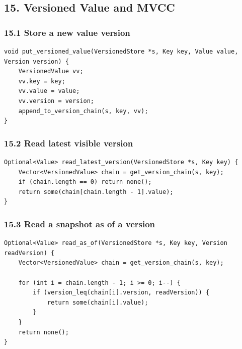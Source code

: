 \documentclass[10pt,letterpaper]{article}
\begin{document}
\subsection*{15. Versioned Value and MVCC}

\subsubsection*{15.1 Store a new value version}

\begin{verbatim}
void put_versioned_value(VersionedStore *s, Key key, Value value, Version version) {
    VersionedValue vv;
    vv.key = key;
    vv.value = value;
    vv.version = version;
    append_to_version_chain(s, key, vv);
}
\end{verbatim}

\subsubsection*{15.2 Read latest visible version}

\begin{verbatim}
Optional<Value> read_latest_version(VersionedStore *s, Key key) {
    Vector<VersionedValue> chain = get_version_chain(s, key);
    if (chain.length == 0) return none();
    return some(chain[chain.length - 1].value);
}
\end{verbatim}

\subsubsection*{15.3 Read a snapshot as of a version}

\begin{verbatim}
Optional<Value> read_as_of(VersionedStore *s, Key key, Version readVersion) {
    Vector<VersionedValue> chain = get_version_chain(s, key);

    for (int i = chain.length - 1; i >= 0; i--) {
        if (version_leq(chain[i].version, readVersion)) {
            return some(chain[i].value);
        }
    }
    return none();
}
\end{verbatim}
\end{document}
